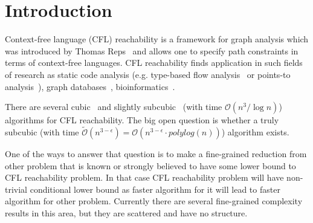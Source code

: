 \documentclass[acmsmall,nonacm]{acmart}
\begin{document}
	
	
	
	\maketitle
	
	\section{Introduction}
	
	Context-free language (CFL) reachability is a framework for graph analysis which was introduced by Thomas Reps~\cite{REPS1998701} and allows one to specify path constraints in terms of context-free languages. CFL reachability finds application in such fields of research as static code analysis (e.g. type-based flow analysis~\cite{10.1145/373243.360208} or points-to analysis~\cite{10.1145/1103845.1094817, 10.1145/1133255.1134027}), graph databases~\cite{10.1145/298514.298576}, bioinformatics~\cite{SubgraphQueriesbyContextfreeGrammars}.
	
	There are several cubic~\cite{10.1145/298514.298576, 10.1145/199448.199462} and slightly subcubic~\cite{10.1145/1328438.1328460} (with time $\mathcal{O}(n^{3} / \log n)$) algorithms for CFL reachability. The big open question is whether a truly subcubic (with time $\tilde{\mathcal{O}}(n^{3 - \epsilon}) = \mathcal{O}(n^{3 - \epsilon} \cdot polylog(n))$) algorithm exists. 
	
	One of the ways to answer that question is to make a fine-grained reduction from other problem that is known or strongly believed to have some lower bound to CFL reachability problem. In that case CFL reachability problem will have non-trivial conditional lower bound as faster algorithm for it will lead to faster algorithm for other problem. Currently there are several fine-grained complexity results in this area, but they are scattered and have no structure.
	
\end{document}
